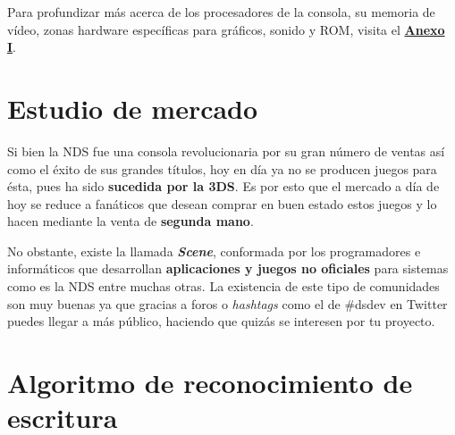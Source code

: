 Para profundizar más acerca de los procesadores de la consola, su memoria de vídeo, zonas hardware específicas para gráficos, sonido y ROM, visita el \hyperref[anexo]{\textbf{Anexo I}}.

\vspace{1cm}


\section{Estudio de mercado}

Si bien la NDS fue una consola revolucionaria por su gran número de ventas así como el éxito de sus grandes títulos, hoy en día ya no se producen juegos para ésta, pues ha sido \textbf{sucedida por la 3DS}. Es por esto que el mercado a día de hoy se reduce a fanáticos que desean comprar en buen estado estos juegos y lo hacen mediante la venta de \textbf{segunda mano}.

\vspace{0.5cm}

No obstante, existe la llamada \textbf{\textit{Scene}}, conformada por los programadores e informáticos que desarrollan \textbf{aplicaciones y juegos no oficiales} para sistemas como es la NDS entre muchas otras. La existencia de este tipo de comunidades son muy buenas ya que gracias a foros o \textit{hashtags} como el de \#dsdev en Twitter puedes llegar a más público, haciendo que quizás se interesen por tu proyecto.

\vspace{1cm}

\section{Algoritmo de reconocimiento de escritura}









